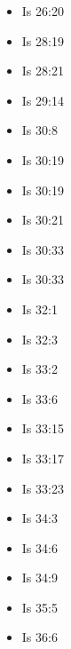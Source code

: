 \documentclass[14pt]{book}
\begin{document}
\begin{multicols}{2}
\begin{itemize}
\item Is 26:20
		
		\item Is 28:19
		
		\item Is 28:21
		
		\item Is 29:14
		
		\item Is 30:8
		
		\item Is 30:19
		
		\item Is 30:19
		
		\item Is 30:21
		
		\item Is 30:33
		
		\item Is 30:33
		
		\item Is 32:1
		
		\item Is 32:3
		
		\item Is 33:2
		
		\item Is 33:6
		
		\item Is 33:15
		
		\item Is 33:17
		
		\item Is 33:23
		
		\item Is 34:3
		
		\item Is 34:6
		
		\item Is 34:9
		
		\item Is 35:5
		
		\item Is 36:6
		

\end{itemize}
\end{multicols}
\end{document}

